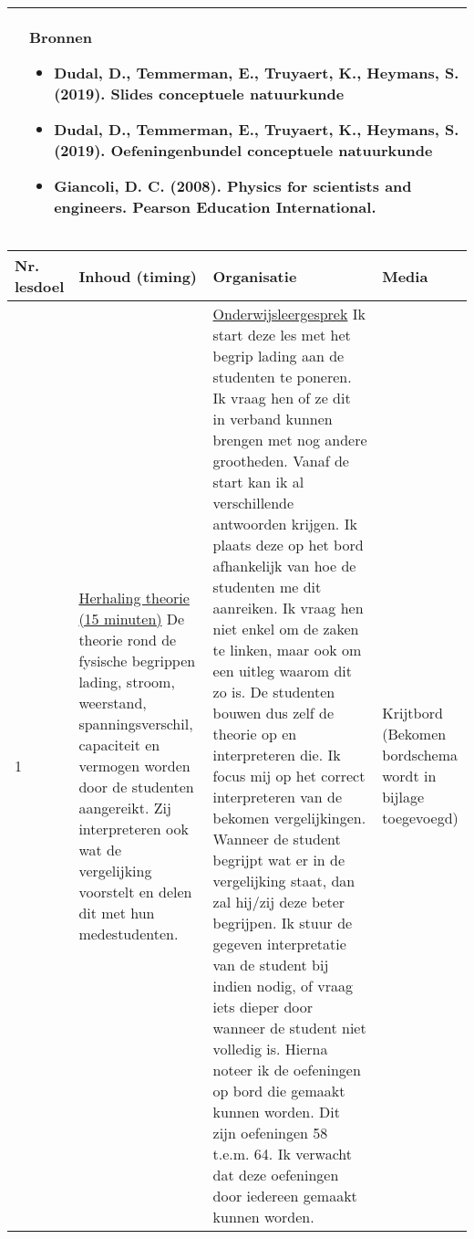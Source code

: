 \begin{landscape}
\begin{tabularx}{1.56\textwidth}{|p{}|X|}
		\\ \cline{2-2}
		  & \textbf{Bronnen}\begin{itemize}
		  	\item Dudal, D., Temmerman, E., Truyaert, K., Heymans, S. (2019). Slides conceptuele natuurkunde
		  	\item Dudal, D., Temmerman, E., Truyaert, K., Heymans, S. (2019). Oefeningenbundel conceptuele natuurkunde
		  	\item Giancoli, D. C. (2008). Physics for scientists and engineers. Pearson Education International.
		  \end{itemize}\\ \hline
	\end{tabularx}


\newpage
	
	\begin{tabularx}{1.56\textwidth}{|p{1.5cm}|p{6cm}|X|p{4cm}|}
		\hline
		\textbf{Nr. lesdoel } & \textbf{Inhoud (timing)}  & \textbf{Organisatie } & \textbf{Media } \\ \hline
		1 &\underline{Herhaling theorie (15 minuten)}\newline
		De theorie rond de fysische begrippen lading, stroom, weerstand, spanningsverschil, capaciteit en vermogen worden door de studenten aangereikt. Zij interpreteren ook wat de vergelijking voorstelt en delen dit met hun medestudenten. 
		&  \underline{Onderwijsleergesprek}\newline 
		Ik start deze les met het begrip lading aan de studenten te poneren. Ik vraag hen of ze dit in verband kunnen brengen met nog andere grootheden. Vanaf de start kan ik al verschillende antwoorden krijgen. Ik plaats deze op het bord afhankelijk van hoe de studenten me dit aanreiken. Ik vraag hen niet enkel om de zaken te linken, maar ook om een uitleg waarom dit zo is. De studenten bouwen dus zelf de theorie op en interpreteren die. \newline
		Ik focus mij op het correct interpreteren van de bekomen vergelijkingen. Wanneer de student begrijpt wat er in de vergelijking staat, dan zal hij/zij deze beter begrijpen. Ik stuur de gegeven interpretatie van de student bij indien nodig, of vraag iets dieper door wanneer de student niet volledig is. 
		\newline 
		Hierna noteer ik de oefeningen op bord die gemaakt kunnen worden. Dit zijn oefeningen 58 t.e.m. 64. Ik verwacht dat deze oefeningen door iedereen gemaakt kunnen worden.  
		& Krijtbord (Bekomen bordschema wordt in bijlage toegevoegd)
		\\ \hline
	\end{tabularx}




\end{landscape}
